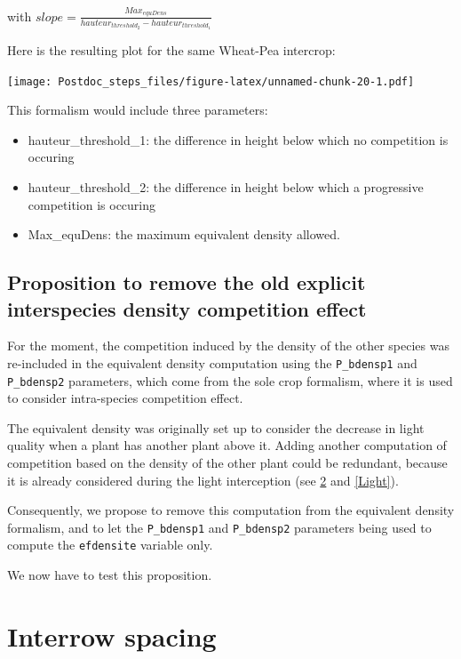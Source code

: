 \documentclass[]{book}
\theoremstyle{definition}
\theoremstyle{definition}
\theoremstyle{definition}
\theoremstyle{remark}
\begin{document}
with
\(slope= \frac{Max_{equDens}}{hauteur_{threshold_2}-hauteur_{threshold_1}}\)

Here is the resulting plot for the same Wheat-Pea intercrop:

\texttt{[image: Postdoc\_steps\_files/figure-latex/unnamed-chunk-20-1.pdf]}

This formalism would include three parameters:

\begin{itemize}
\item
  hauteur\_threshold\_1: the difference in height below which no
  competition is occuring
\item
  hauteur\_threshold\_2: the difference in height below which a
  progressive competition is occuring
\item
  Max\_equDens: the maximum equivalent density allowed.
\end{itemize}

\section{Proposition to remove the old explicit interspecies density
competition
effect}\label{proposition-to-remove-the-old-explicit-interspecies-density-competition-effect}

For the moment, the competition induced by the density of the other
species was re-included in the equivalent density computation using the
\texttt{P\_bdensp1} and \texttt{P\_bdensp2} parameters, which come from
the sole crop formalism, where it is used to consider intra-species
competition effect.

The equivalent density was originally set up to consider the decrease in
light quality when a plant has another plant above it. Adding another
computation of competition based on the density of the other plant could
be redundant, because it is already considered during the light
interception (see \ref{Interrow} and \ref{Light}).

Consequently, we propose to remove this computation from the equivalent
density formalism, and to let the \texttt{P\_bdensp1} and
\texttt{P\_bdensp2} parameters being used to compute the
\texttt{efdensite} variable only.

We now have to test this proposition.

\chapter{Interrow spacing}\label{Interrow}
\end{document}
